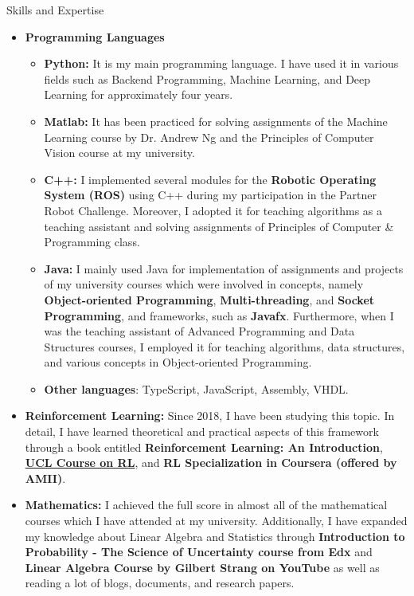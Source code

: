 \documentclass[]{mcdowellcv}
\begin{document}
    \begin{cvsection}{Skills and Expertise}
    	\begin{cvsubsection}{}{}{}
    	\end{cvsubsection}
    	\begin{itemize}
    	    \item \textbf{Programming Languages}
    	    \begin{itemize}
    	        \item \textbf{Python:} It is my main programming language. I have used it in various fields such as Backend Programming, Machine Learning, and Deep Learning for approximately four years.
    	        \item \textbf{Matlab:} It has been practiced for solving assignments of the Machine Learning course by Dr. Andrew Ng and the Principles of Computer Vision course at my university. 
    	        \item \textbf{C++:} I implemented several modules for the \textbf{Robotic Operating System (ROS)} using C++ during my participation in the Partner Robot Challenge. Moreover, I adopted it for teaching algorithms as a teaching assistant and solving assignments of Principles of Computer \& Programming class. 
    	        \item \textbf{Java:} I mainly used Java for implementation of assignments and projects of my university courses which were involved in concepts, namely \textbf{Object-oriented Programming}, \textbf{Multi-threading}, and \textbf{Socket Programming}, and frameworks, such as \textbf{Javafx}. Furthermore, when I was the teaching assistant of Advanced Programming and Data Structures courses, I employed it for teaching algorithms, data structures, and various concepts in Object-oriented Programming.
    	        \item \textbf{Other languages}: TypeScript, JavaScript, Assembly, VHDL.
    	    \end{itemize}
    	    \item{\textbf{Reinforcement Learning:}} Since 2018, I have been studying this topic. In detail, I have learned theoretical and practical aspects of this framework through a book entitled \textbf{Reinforcement Learning: An Introduction}, \href{http://www0.cs.ucl.ac.uk/staff/d.silver/web/Teaching.html}{\textbf{UCL Course on RL}}, and \textbf{RL Specialization in Coursera (offered by AMII)}.
    	    \item{\textbf{Mathematics:}} I achieved the full score in almost all of the mathematical courses which I have attended at my university. Additionally, I have expanded my knowledge about Linear Algebra and Statistics through \textbf{Introduction to Probability - The Science of Uncertainty course from Edx} and \textbf{Linear Algebra Course by Gilbert Strang on YouTube} as well as reading a lot of blogs, documents, and research papers.

\end{itemize}
\end{cvsection}
\end{document}
